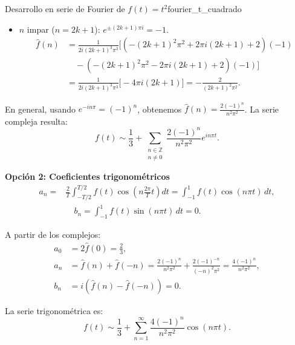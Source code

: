 \begin{ejemplo}{Desarrollo en serie de Fourier de $f(t) = t^2$}{fourier_t_cuadrado}
\begin{itemize}
    \item $n$ impar ($n = 2k+1$): $e^{\pm(2k+1)\pi i} = -1$.
    \begin{align*}
        \hat{f}(n) &= \frac{1}{2 i (2k+1)^3 \pi^3} \Big[ \left(-(2k+1)^2\pi^2 + 2\pi i (2k+1) + 2\right)(-1) \\
        &\quad - \left(-(2k+1)^2\pi^2 - 2\pi i (2k+1) + 2\right)(-1) \Big] \\
        &= \frac{1}{2 i (2k+1)^3 \pi^3} \big[ -4\pi i (2k+1) \big] = -\frac{2}{(2k+1)^2 \pi^2}.
    \end{align*}
\end{itemize}

En general, usando $e^{-i n \pi} = (-1)^n$, obtenemos $\hat{f}(n) = \frac{2(-1)^n}{n^2 \pi^2}$.
La serie compleja resulta:
\[
f(t) \sim \frac{1}{3} + \sum_{\substack{n \in \mathbb{Z} \\ n \neq 0}} \frac{2(-1)^n}{n^2 \pi^2} e^{i n \pi t}.
\]

\vspace{0.3cm}
\textbf{Opción 2: Coeficientes trigonométricos} \\
\begin{align*}
a_n =& \frac{2}{T} \int_{-T/2}^{T/2} f(t) \cos\left(n \frac{2\pi}{T} t\right) dt = \int_{-1}^{1} f(t) \cos(n \pi t) \, dt, \\
& \quad b_n = \int_{-1}^{1} f(t) \sin(n \pi t) \, dt = 0.
\end{align*}

A partir de los complejos:
\begin{align*}
a_0 &= 2 \hat{f}(0) = \frac{2}{3}, \\
a_n &= \hat{f}(n) + \hat{f}(-n) = \frac{2(-1)^n}{n^2 \pi^2} + \frac{2(-1)^{-n}}{(-n)^2 \pi^2} = \frac{4(-1)^n}{n^2 \pi^2}, \\
b_n &= i(\hat{f}(n) - \hat{f}(-n)) = 0.
\end{align*}

La serie trigonométrica es:
\[
f(t) \sim \frac{1}{3} + \sum_{n=1}^\infty \frac{4(-1)^n}{n^2 \pi^2} \cos(n \pi t).
\]

\end{ejemplo}

